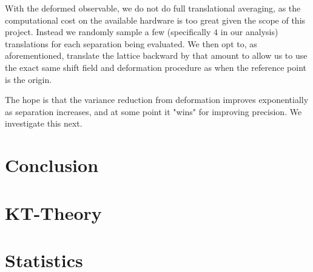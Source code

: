 \documentclass[12pt]{article}
\begin{document}
With the deformed observable, we do not do full translational averaging, as the computational cost on the available hardware is too great given the scope of this project.
Instead we randomly sample a few (specifically $4$ in our analysis) translations for each separation being evaluated. We then opt to, as aforementioned, translate the lattice backward by that amount to allow us to use the exact same shift field and 
deformation procedure as when the reference point is the origin.

The hope is that the variance reduction from deformation improves exponentially as separation increases, and at some point it "wins" for improving precision. We investigate
this next.

\section{Conclusion}

\begin{appendices}

	\section{KT-Theory}

	\section{Statistics}

\end{appendices}

\newpage

\printbibliography
\end{document}
